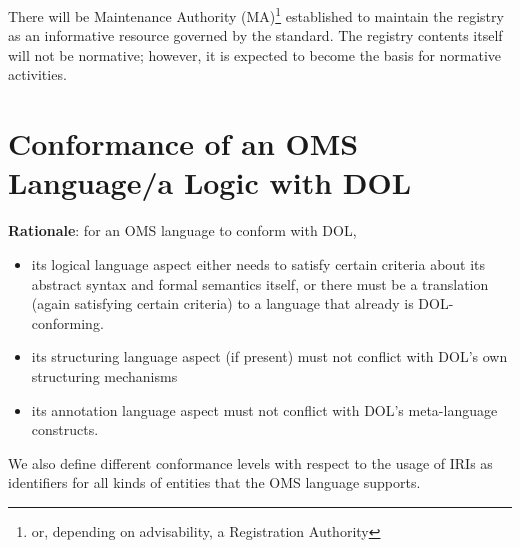 \documentclass[10pt,fleqn,%
\ifpretendfinal
final%
\else
draft%
\fi,
]{scrreprt}
\makeatletter
\newcommand*\CommentAuthor{}
\renewcommand*\CommentAuthor{#1}}
\newcommand*\CommentDate{}
\renewcommand*\CommentDate{#1}}
\newcommand*\CommentId{}
\renewcommand*\CommentId{#1}}
\newcommand*\CommentType{}
\renewcommand*\CommentType{#1}}
\newcommand*{\SetCommentColorByType}[1]{%
\edef\localType{{#1}}%
\expandafter\ifstrequal\localType{q-aut}{\colorlet{CommentColor}{red}}{%
\expandafter\ifstrequal\localType{q-all}{\colorlet{CommentColor}{orange}}{%
\expandafter\ifstrequal\localType{todo}{\colorlet{CommentColor}{orange}}{%
\expandafter\ifstrequal\localType{fyi}{\colorlet{CommentColor}{lightgray}}{%
\colorlet{CommentColor}{yellow}}}}}}
\newcommand*{\SetCommentPrefixByType}[1]{%
\edef\localType{{#1}}%
\expandafter\@ifmtarg\localType{%
\edef\CommentPrefix{}%
}{%
\caseupper[q]{#1}%
\edef\CommentPrefix{\thestring: }%
}}
\newcommand*{\initComment}[1]{%
\setkeys{Comment}{#1}%
\SetCommentColorByType{\CommentType}%
\relax%
\SetCommentPrefixByType{\CommentType}%
\relax%
}
\newcommand*{\todonote}[2][]{%
\initComment{#1}%
\pdfcomment[author=\CommentAuthor,color=CommentColor,date=\CommentDate,id=\CommentId]{%
\CommentPrefix
#2}}
\renewcommand*{\todonote}[2][]{%
\initComment{#1}%
\ednote{\CommentPrefix #2}}
\newcommand{\sclause}[1]{\section{#1}}
\makeatother
\begin{document}
There will be Maintenance Authority (MA)\footnote{or, depending on advisability, a Registration
Authority} established to maintain the registry as an informative resource governed by the
standard.  The registry contents itself will not be normative; however, it is 
expected to become the basis for normative activities.


\sclause{Conformance of an OMS Language/a Logic with DOL}\label{c:conform:logic}

\begin{fminipage}{\textwidth}
\textbf{Rationale}: for an OMS language to conform with DOL,
\begin{itemize}
\item its logical language aspect either needs to satisfy certain criteria about its abstract
syntax and formal semantics itself, or there must be a translation (again satisfying certain
criteria) to a language that already is DOL-conforming.
\item its structuring language aspect (if present) must not conflict with DOL's own structuring
mechanisms
\item its annotation language aspect must not conflict with DOL's meta-language constructs.
\end{itemize}
We also define different conformance levels with respect to the usage of IRIs as identifiers for all kinds
of entities that the OMS language supports.
\end{fminipage}


%
%
\end{document}
